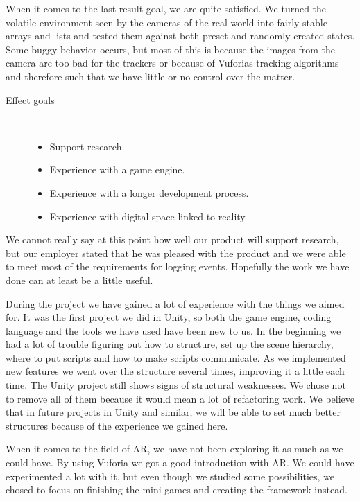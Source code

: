When it comes to the last result goal, we are quite satisfied.
We turned the volatile environment seen by the cameras of the real world
into fairly stable arrays and lists and tested them against both preset 
and randomly created states. Some buggy behavior occurs, but most of this
is because the images from the camera are too bad for the trackers or because
of Vuforias tracking algorithms and therefore such that we have little or no 
control over the matter.

\clearpage

\begin{description}
	\item[Effect goals]\ 
	\begin{itemize}
		\item Support research.
		\item Experience with a game engine.
		\item Experience with a longer development process.
		\item Experience with digital space linked to reality.
	\end{itemize}
\end{description}

We cannot really say at this point how well our product will support research,
but our employer stated that he was pleased with the product and we were able
to meet most of the requirements for logging events. Hopefully the work we have
done can at least be a little useful.

During the project we have gained a lot of experience with the things we aimed
for.
It was the first project we did in Unity, so both the game engine, coding
language and the tools we have used have been new to us.
In the beginning we had a lot of trouble figuring out how to structure, set up
the scene hierarchy, where to put scripts and how to make scripts communicate.
As we implemented new features we went over the structure several times, improving it a little each time. 
The Unity project still shows signs of structural weaknesses.
We chose not to remove all of them because it would mean a lot of refactoring work. 
We believe that in future projects in Unity and similar, we will be able to set much better structures because of the experience we gained here.

When it comes to the field of AR, we have not been exploring it as much as
we could have. By using Vuforia we got a good introduction with AR. We could
have experimented a lot with it, but even though we studied some possibilities,
we chosed to focus on finishing the mini games and creating the framework
instead.